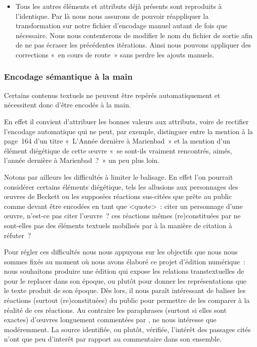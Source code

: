 \documentclass[12pt, a4paper]{article}
\begin{document}
\begin{itemize}
    \item Tous les autres éléments et attributs déjà présents sont reproduits à l'identique. Par là nous nous assurons de pouvoir réappliquer la transformation sur notre fichier d'encodage manuel autant de fois que nécessaire. Nous nous contenterons de modifier le nom du fichier de sortie afin de ne pas écraser les précédentes itérations. Ainsi nous pouvons appliquer des corrections «~en cours de route~» sans perdre les ajouts manuels.
\end{itemize}


\subsubsection{Encodage sémantique à la main}
Certains contenus textuels ne peuvent être repérés automatiquement et nécessitent donc d'être encodés à la main.

En effet il convient d'attribuer les bonnes valeurs aux attributs, voire de rectifier l'encodage automatique qui ne peut, par exemple, distinguer entre la mention à la page~164 d'un titre «~L'Année dernière à Marienbad~» et la mention d'un élément diégétique de cette œuvre «~se sont-ils vraiment rencontrés, aimés, l’année dernière à Marienbad~?~» un peu plus loin.

Notons par ailleurs les difficultés à limiter le balisage. En effet l'on pourrait considérer certains éléments diégétique, tels les allusions aux personnages des œuvres de Beckett ou les supposées réactions sus-citées que \robbe{} prête au public comme devant être encodées en tant que <quote>~: citer un personnage d'une œuvre, n'est-ce pas citer l'œuvre~? ces réactions mêmes (re)constituées par \robbe{} ne sont-elles pas des éléments textuels mobilisés par \robbe{} à la manière de citation à réfuter~?

Pour régler ces difficultés nous nous appuyons sur les objectifs que nous nous sommes fixés au moment où nous avons élaboré ce projet d'édition numérique~: nous souhaitons produire une édition qui expose les relations transtextuelles de \punr pour le replacer dans son époque, ou plutôt pour donner les représentations que le texte produit de son époque. Dès lors, il nous paraît intéressant de baliser les réactions (surtout (re)constituées) du public pour permettre de les comparer à la réalité de ces réactions. Au contraire les paraphrases (surtout si elles sont exactes) d'œuvres longuement commentées par \robbe, ne nous intéresse que modéremment. La source identifiée, ou plutôt, vérifiée, l'intérêt des passages cités n'ont que peu d'interêt par rapport au commentaire dans son ensemble.
\end{document}
